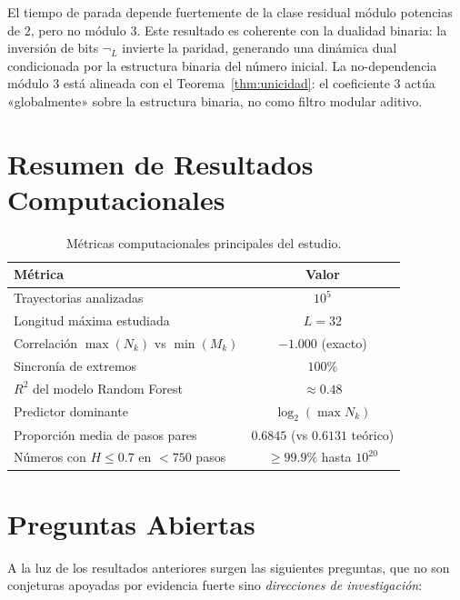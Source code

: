 \documentclass[11pt,a4paper]{article}
\begin{document}
\noindent
El tiempo de parada depende fuertemente de la clase residual módulo
potencias de $2$, pero no módulo $3$.
Este resultado es coherente con la dualidad binaria: la inversión de
bits $\neg_L$ invierte la paridad, generando una dinámica dual
condicionada por la estructura binaria del número inicial.
La no-dependencia módulo $3$ está alineada con el
Teorema~\ref{thm:unicidad}: el coeficiente $3$ actúa «globalmente»
sobre la estructura binaria, no como filtro modular aditivo.

\section{Resumen de Resultados Computacionales}
\label{sec:resultados_comp}

\begin{table}[h!]
\centering
\caption{Métricas computacionales principales del estudio.}
\label{tab:resumen}
\begin{tabular}{lc}
\toprule
Métrica & Valor \\
\midrule
Trayectorias analizadas               & $10^5$ \\
Longitud máxima estudiada             & $L = 32$ \\
Correlación $\max(N_k)$ vs $\min(M_k)$ & $-1.000$ (exacto) \\
Sincronía de extremos                 & $100\%$ \\
$R^2$ del modelo Random Forest        & $\approx 0.48$ \\
Predictor dominante                   & $\log_2(\max N_k)$ \\
Proporción media de pasos pares       & $0.6845$ (vs $0.6131$ teórico) \\
Números con $H \le 0.7$ en $<750$ pasos & $\ge 99.9\%$ hasta $10^{20}$ \\
\bottomrule
\end{tabular}
\end{table}

\section{Preguntas Abiertas}
\label{sec:open}

A la luz de los resultados anteriores surgen las siguientes preguntas,
que no son conjeturas apoyadas por evidencia fuerte sino
\emph{direcciones de investigación}:
\end{document}
